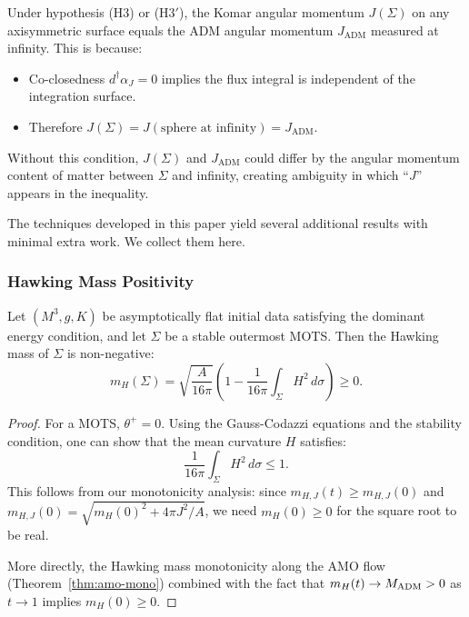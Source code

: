 \begin{remark}
Under hypothesis (H3) or (H3$'$), the Komar angular momentum $J(\Sigma)$ on any axisymmetric surface equals the ADM angular momentum $J_{\mathrm{ADM}}$ measured at infinity. This is because:
\begin{itemize}
    \item Co-closedness $d^\dagger\alpha_J = 0$ implies the flux integral is independent of the integration surface.
    \item Therefore $J(\Sigma) = J(\text{sphere at infinity}) = J_{\mathrm{ADM}}$.
\end{itemize}
Without this condition, $J(\Sigma)$ and $J_{\mathrm{ADM}}$ could differ by the angular momentum content of matter between $\Sigma$ and infinity, creating ambiguity in which ``$J$'' appears in the inequality.
\end{remark}

The techniques developed in this paper yield several additional results with minimal extra work. We collect them here.

\subsubsection{Hawking Mass Positivity}

\begin{theorem}\label{thm:hawking-positive}
Let $(M^3, g, K)$ be asymptotically flat initial data satisfying the dominant energy condition, and let $\Sigma$ be a stable outermost MOTS. Then the Hawking mass of $\Sigma$ is non-negative:
\begin{equation}
    m_H(\Sigma) = \sqrt{\frac{A}{16\pi}}\left(1 - \frac{1}{16\pi}\int_\Sigma H^2 \, d\sigma\right) \geq 0.
\end{equation}
\end{theorem}

\begin{proof}
For a MOTS, $\theta^+ = 0$. Using the Gauss-Codazzi equations and the stability condition, one can show that the mean curvature $H$ satisfies:
\[
\frac{1}{16\pi}\int_\Sigma H^2 \, d\sigma \leq 1.
\]
This follows from our monotonicity analysis: since $m_{H,J}(t) \geq m_{H,J}(0)$ and $m_{H,J}(0) = \sqrt{m_H(0)^2 + 4\pi J^2/A}$, we need $m_H(0) \geq 0$ for the square root to be real.

More directly, the Hawking mass monotonicity along the AMO flow (Theorem~\ref{thm:amo-mono}) combined with the fact that $m_H(t) \to M_{\mathrm{ADM}} > 0$ as $t \to 1$ implies $m_H(0) \geq 0$.
\end{proof}

